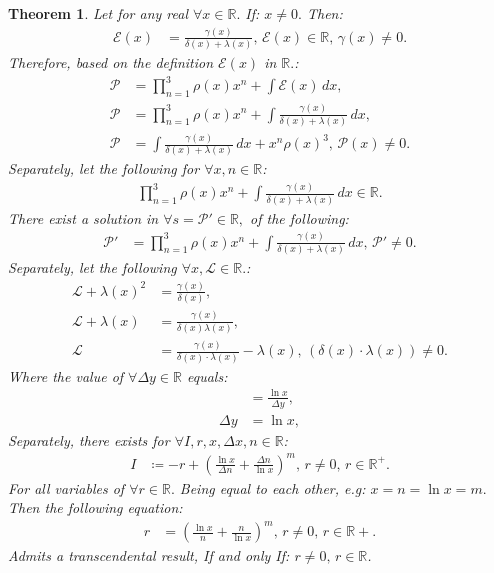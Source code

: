 \documentclass[10pt]{article}
\theoremstyle{plain}
\newtheorem{theorem}{Theorem}[section]
\theoremstyle{definition}
\theoremstyle{remark}
\begin{document}
\begin{theorem}
	Let for any real $\forall x \in \mathbb{R}.$ If: $x \neq 0.$ Then:
	\begin{align*}
		\mathcal{E}(x) &= \frac{\gamma(x)}{\delta(x) + \lambda(x)}, \, \mathcal{E}(x) \in \mathbb{R}, \, \gamma(x) \neq 0.
	\end{align*}
	Therefore, based on the definition $\mathcal{E}(x)$ in $\mathbb{R}.$:
	\begin{align*}
		\mathcal{P} &= \prod_{n=1}^{3}\rho(x) x^{n} + \int \mathcal{E}(x) \, dx,\\
		\mathcal{P} &= \prod_{n=1}^{3}\rho(x) x^{n} + \int \frac{\gamma(x)}{\delta(x) + \lambda(x)} \, dx,\\
		\mathcal{P} &= \int \frac{\gamma(x)}{\delta(x) + \lambda(x)} \, dx + x^{n} \rho(x)^{3}, \, \mathcal{P}(x) \neq 0.
	\end{align*}
	Separately, let the following for $\forall x, n \in \mathbb{R}$:
	\begin{align*}
		\prod_{n=1}^{3}\rho(x) x^{n} + \int \frac{\gamma(x)}{\delta(x) + \lambda(x)} \, dx \in \mathbb{R}.
	\end{align*}
	There exist a solution in $\forall s = \mathcal{P}' \in \mathbb{R},$ of the following:
	\begin{align*}
		\mathcal{P}' &= \prod_{n=1}^{3}\rho(x) x^{n} + \int \frac{\gamma(x)}{\delta(x) + \lambda(x)} \, dx, \, \mathcal{P}' \neq 0.
	\end{align*}
	Separately, let the following $\forall x, \mathcal{L} \in \mathbb{R}.$:
	\begin{align*}
		\mathcal{L} + \lambda(x)^{2} &= \frac{\gamma(x)}{\delta(x)},\\
	 	\mathcal{L} + \lambda(x) &= \frac{\gamma(x)}{\delta(x)  \lambda(x) },\\
	 	\mathcal{L} &= \frac{\gamma(x)}{\delta(x) \cdot \lambda(x) } - \lambda(x), \, (\delta(x) \cdot \lambda(x)) \neq 0.
	\end{align*}
	Where the value of $\forall \Delta y \in \mathbb{R}$ equals:
	\begin{align*}
		&= \frac{\ln x}{\Delta y},\\
		\Delta y &= \ln x,
	\end{align*}
	Separately, there exists for $\forall I, r, x, \Delta x, n \in \mathbb{R}$:
	\begin{align*}
		I &\coloneq -r + ( \frac{\ln x}{\Delta n} + \frac{\Delta n}{\ln x})^m, \, r \neq 0, \, r \in \mathbb{R}^{+}.
	\end{align*}
	For all variables of $\forall r \in \mathbb{R}.$ Being equal to each other, e.g: $x = n = \ln x = m.$ Then the following equation:
	\begin{align*}
		r &= ( \frac{\ln x}{n} + \frac{n}{\ln x})^m, \, r \neq 0, \, r \in \mathbb{R}{+}.
	\end{align*}
	Admits a transcendental result, If and only If: $r \neq 0, \, r \in \mathbb{R}$.
\end{theorem}
\end{document}
